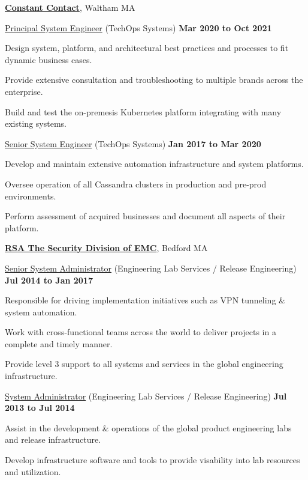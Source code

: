 \documentclass[10pt]{article}
\renewcommand\textit[1]{\underline{#1}}
\newcommand{\halfblankline}{\quad\vspace{-0.5\baselineskip}\pagebreak[3]}
\begin{document}
\href{https://www.constantcontact.com/}{\textbf{Constant Contact}},
Waltham MA
\begin{outerlist}
	\item[] \textit{Principal System Engineer} (TechOps Systems)
        \hfill \textbf{Mar 2020 to Oct 2021}
	\begin{innerlist}
		\item Design system, platform, and architectural best practices and processes to fit dynamic business cases.
		\item Provide extensive consultation and troubleshooting to multiple brands across the enterprise.
		\item Build and test the on-premesis Kubernetes platform integrating with many existing systems.
        \end{innerlist}

	\item[] \textit{Senior System Engineer} (TechOps Systems)
        \hfill \textbf{Jan 2017 to Mar 2020}
	\begin{innerlist}
		\item Develop and maintain extensive automation infrastructure and system platforms.
		\item Oversee operation of all Cassandra clusters in production and pre-prod environments.
		\item Perform assessment of acquired businesses and document all aspects of their platform.
        \end{innerlist}
\end{outerlist}
\halfblankline

\href{https://www.rsa.com/}{\textbf{RSA The Security Division of EMC}},
Bedford MA
\begin{outerlist}
   	\item[] \textit{Senior System Administrator} (Engineering Lab Services / Release Engineering)
        \hfill \textbf{Jul 2014 to Jan 2017}
        \begin{innerlist}
		\item Responsible for driving implementation initiatives such as VPN tunneling \& system automation. 
		\item Work with cross-functional teams across the world to deliver projects in a complete and timely manner. 		
		\item Provide level 3 support to all systems and services in the global engineering infrastructure.
        \end{innerlist}

    	\item[] \textit{System Administrator} (Engineering Lab Services / Release Engineering)
        \hfill \textbf{Jul 2013 to Jul 2014}
        \begin{innerlist}
               \item Assist in the development \& operations of the global product engineering labs and release infrastructure.
               \item Develop infrastructure software and tools to provide visability into lab resources and utilization.
        \end{innerlist}
\end{outerlist}
\halfblankline
\end{document}
